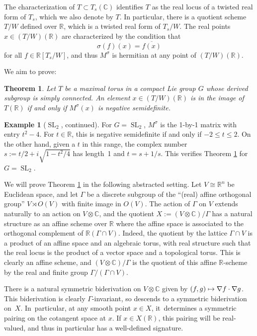 \documentclass[JEP,XML,SOM,Unicode,NoFloatCountersInSection,published]{cedram}
\newcommand\mto{\mathchoice{\longmapsto}{\mapsto}{\mapsto}{\mapsto}}
\newtheorem{thm}[equation]{Theorem}
\theoremstyle{definition}
\newtheorem{example}[equation]{Example}
\newcommand{\R}{\mathbb{R}}
\newcommand{\C}{\mathbb{C}}
\DeclareMathOperator{\SL}{SL}
\begin{document}
The characterization of $T\subset T_s(\C)$ identifies $T$ as the real locus
of a twisted real form of $T_s$, which we also denote by $T$. In
particular, there is a quotient scheme $T/W$ defined over $\R$, which is a
twisted real form of $T_s/W$. The real points $x\in (T/W)(\R)$ are
characterized by the condition that
\[
\sigma(f)(x) = \overline{f(x)}
\]
for all $f\in \R[T_s/W]$, and thus $M^\sigma$ is hermitian at any point
of $(T/W)(\R)$.

We aim to prove:

\begin{thm} \label{neg.sd}
Let $T$ be a maximal torus in a compact Lie group $G$ whose derived subgroup is simply connected.
An element $x \in (T/W)(\R)$ is in the image of $T(\R)$ if and only if $M^\sigma(x)$ is negative semidefinite.
\end{thm}

\begin{example}[$\SL_2$, continued] \label{A1.eg3}
For $G = \SL_2$, $M^\sigma$ is the 1-by-1 matrix with entry $t^2 - 4$. For $t \in \R$, this is negative semidefinite if and only if $-2 \le t \le 2$. On the other hand, given a $t$ in this range, the complex number $s := t/2 + i \sqrt{1 - t^2/4}$ has length~1 and $t = s + 1/s$. This verifies Theorem \ref{neg.sd} for $G = \SL_2$.
\end{example}

We will prove Theorem \ref{neg.sd} in the following abstracted setting.
Let $V\cong \R^n$ be Euclidean space, and let $\Gamma$
be a discrete subgroup of the ``(real) affine orthogonal group'' $V\rtimes O(V)$ with finite image in $O(V)$.
The action of $\Gamma$ on $V$ extends naturally to an
action on $V\otimes \C$, and the quotient $X:=(V\otimes \C)/\Gamma$ has a
natural structure as an affine scheme over $\R$ where the affine space is
associated to the orthogonal complement of $\R(\Gamma\cap V)$. Indeed, the quotient
by the lattice $\Gamma \cap V$ is a product of an affine space and an algebraic
torus, with real structure such that the real locus is the product of a
vector space and a topological torus. This is clearly an affine scheme,
and $(V\otimes \C)/\Gamma$ is the quotient of this affine $\R$-scheme by the
real and finite group $\Gamma/(\Gamma \cap V)$.

There is a natural symmetric biderivation on $V\otimes \C$ given by
$(f,g)\mto \nabla f\cdot \nabla g$.
This biderivation is clearly $\Gamma$-invariant,
so descends to a symmetric biderivation on~$X$. In~particular, at any
smooth point $x\in X$, it~determines a symmetric pairing on the
cotangent space at $x$. If $x\in X(\R)$, this pairing will be
real-valued, and thus in particular has a well-defined signature.
\end{document}
